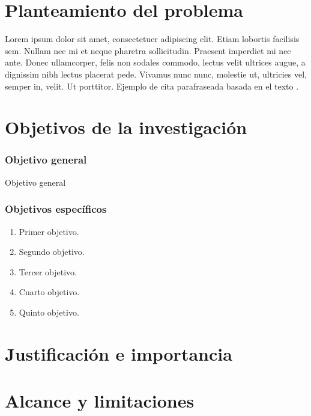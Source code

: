 \section{Planteamiento del problema}
	
	\Blindtext

	Lorem ipsum dolor sit amet, consectetuer adipiscing elit. Etiam lobortis facilisis sem. Nullam nec mi et neque pharetra sollicitudin. Praesent imperdiet mi nec ante. Donec ullamcorper, felis non sodales commodo, lectus velit ultrices augue, a dignissim nibh lectus placerat pede. Vivamus nunc nunc, molestie ut, ultricies vel, semper in, velit. Ut porttitor. Ejemplo de cita parafraseada basada en el texto \Parencite{ogata2003ingenieria}.
	
\section{Objetivos de la investigación}
	
	\subsubsection{Objetivo general}
		
		Objetivo general
		
	\subsubsection{Objetivos específicos}
		
		\begin{enumerate}[leftmargin=\parindent]
			
			\item Primer objetivo.
			
			\item Segundo objetivo.
			
			\item Tercer objetivo.
			
			\item Cuarto objetivo.
			
			\item Quinto objetivo.
		
		\end{enumerate}

\section{Justificación e importancia}
	
	\blindtext[2]
	
\section{Alcance y limitaciones}

	\blindtext[3]
